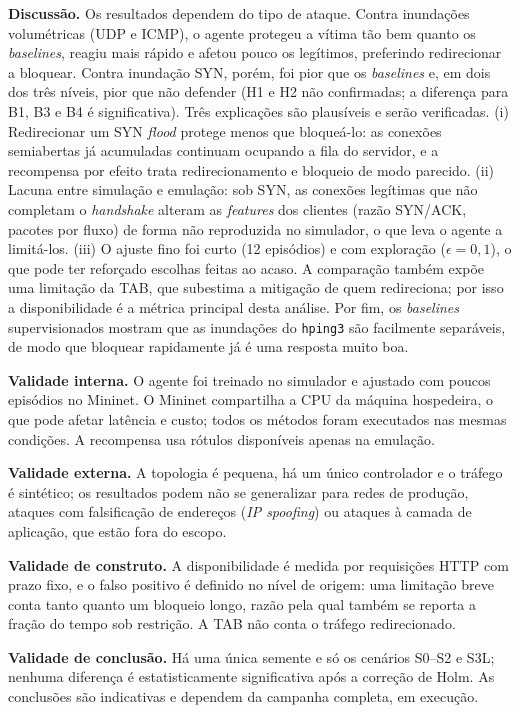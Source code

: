 \documentclass[12pt]{article}
\begin{document}
\textbf{Discussão.} Os resultados dependem do tipo de ataque.
Contra inundações volumétricas (UDP e ICMP), o agente protegeu a vítima tão bem
quanto os \textit{baselines}, reagiu mais rápido e afetou pouco os legítimos,
preferindo redirecionar a bloquear. Contra inundação SYN, porém, foi pior que
os \textit{baselines} e, em dois dos três níveis, pior que não defender (H1 e
H2 não confirmadas; a diferença para B1, B3 e B4 é significativa). Três explicações são plausíveis e serão
verificadas. (i) Redirecionar um SYN \textit{flood} protege menos que
bloqueá-lo: as conexões semiabertas já acumuladas continuam ocupando a fila do
servidor, e a recompensa por efeito trata redirecionamento e bloqueio de modo
parecido. (ii) Lacuna entre simulação e emulação: sob SYN, as conexões
legítimas que não completam o \textit{handshake} alteram as \textit{features}
dos clientes (razão SYN/ACK, pacotes por fluxo) de forma não reproduzida no
simulador, o que leva o agente a limitá-los. (iii) O ajuste fino foi curto
(12 episódios) e com exploração ($\epsilon=0{,}1$), o que pode ter reforçado
escolhas feitas ao acaso. A comparação também expõe uma limitação da TAB, que
subestima a mitigação de quem redireciona; por isso a disponibilidade é a
métrica principal desta análise. Por fim, os \textit{baselines}
supervisionados mostram que as inundações do \texttt{hping3} são facilmente
separáveis, de modo que bloquear rapidamente já é uma resposta muito boa.

\textbf{Validade interna.} O agente foi treinado no simulador e ajustado com
poucos episódios no Mininet. O Mininet compartilha a CPU da máquina hospedeira,
o que pode afetar latência e custo; todos os métodos foram executados nas
mesmas condições. A recompensa usa rótulos disponíveis apenas na emulação.

\textbf{Validade externa.} A topologia é pequena, há um único controlador e o
tráfego é sintético; os resultados podem não se generalizar para redes de
produção, ataques com falsificação de endereços (\textit{IP spoofing}) ou
ataques à camada de aplicação, que estão fora do escopo.

\textbf{Validade de construto.} A disponibilidade é medida por requisições
HTTP com prazo fixo, e o falso positivo é definido no nível de origem: uma
limitação breve conta tanto quanto um bloqueio longo, razão pela qual também se
reporta a fração do tempo sob restrição. A TAB não conta o tráfego
redirecionado.

\textbf{Validade de conclusão.} Há uma única semente e só os cenários S0--S2 e
S3L; nenhuma diferença é estatisticamente significativa após a correção de
Holm. As conclusões são indicativas e dependem da campanha completa, em
execução.
\end{document}
